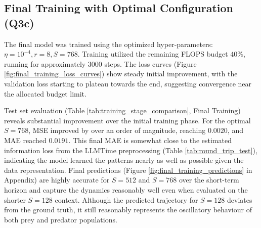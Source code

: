 \documentclass{article}
\begin{document}
\subsection{Final Training with Optimal Configuration (Q3c)}
\label{sec:final}
The final model was trained using the optimized hyper-parameters: $\eta=10^{-4}, r=8, S=768$. Training utilized the remaining FLOPS budget $40\%$, running for approximately 3000 steps. The loss curves (Figure \ref{fig:final_training_loss_curves}) show steady initial improvement, with the validation loss starting to plateau towards the end, suggesting convergence near the allocated budget limit.

Test set evaluation (Table \ref{tab:training_stage_comparison}, Final Training) reveals substantial improvement over the initial training phase. For the optimal $S=768$, MSE improved by over an order of magnitude, reaching $0.0020$, and MAE reached $0.0191$. This final MAE is somewhat close to the estimated information loss from the LLMTime preprocessing (Table \ref{tab:round_trip_test}), indicating the model learned the patterns nearly as well as possible given the data representation. Final predictions (Figure \ref{fig:final_training_predictions} in Appendix) are highly accurate for $S=512$ and $S=768$ over the short-term horizon and capture the dynamics reasonably well even when evaluated on the shorter $S=128$ context. Although the predicted trajectory for $S=128$ deviates from the ground truth, it still reasonably represents the oscillatory behaviour of both prey and predator populations.
\end{document}
